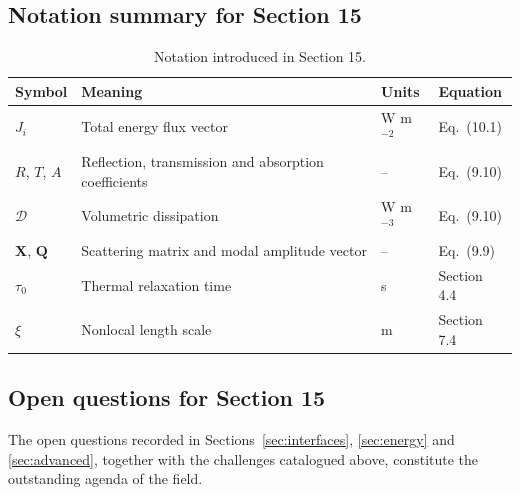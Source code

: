 \subsection{Notation summary for Section 15}

\begin{table}[htbp]
\centering
\small
\caption{Notation introduced in Section 15.}
\label{tab:notation-sec15}
\begin{tabularx}{\textwidth}{@{}p{1.8cm}X p{2.2cm}p{2.1cm}@{}}
\toprule
\textbf{Symbol} & \textbf{Meaning} & \textbf{Units} & \textbf{Equation} \\
\midrule
$J_i$ & Total energy flux vector & W m$^{-2}$ & Eq.~(10.1) \\
$R$, $T$, $A$ & Reflection, transmission and absorption coefficients & -- & Eq.~(9.10) \\
$\mathcal{D}$ & Volumetric dissipation & W m$^{-3}$ & Eq.~(9.10) \\
$\bm{X}$, $\bm{Q}$ & Scattering matrix and modal amplitude vector & -- & Eq.~(9.9) \\
$\tau_0$ & Thermal relaxation time & s & Section 4.4 \\
$\xi$ & Nonlocal length scale & m & Section 7.4 \\
\bottomrule
\end{tabularx}
\end{table}

\subsection{Open questions for Section 15}

The open questions recorded in Sections~\ref{sec:interfaces}, \ref{sec:energy} and \ref{sec:advanced}, together with the challenges catalogued above, constitute the outstanding agenda of the field.

